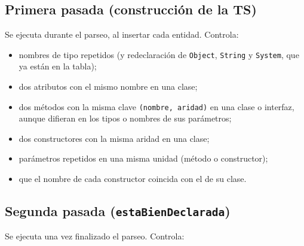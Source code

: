 \documentclass[11pt,a4paper]{article}
\begin{document}
\subsection{Primera pasada (construcción de la TS)}

Se ejecuta durante el parseo, al insertar cada entidad. Controla:

\begin{itemize}
  \item nombres de tipo repetidos (y redeclaración de \texttt{Object},
        \texttt{String} y \texttt{System}, que ya están en la tabla);
  \item dos atributos con el mismo nombre en una clase;
  \item dos métodos con la misma clave \texttt{(nombre, aridad)} en una clase o
        interfaz, aunque difieran en los tipos o nombres de sus parámetros;
  \item dos constructores con la misma aridad en una clase;
  \item parámetros repetidos en una misma unidad (método o constructor);
  \item que el nombre de cada constructor coincida con el de su clase.
\end{itemize}

\subsection{Segunda pasada (\texttt{estaBienDeclarada})}

Se ejecuta una vez finalizado el parseo. Controla:
\end{document}
